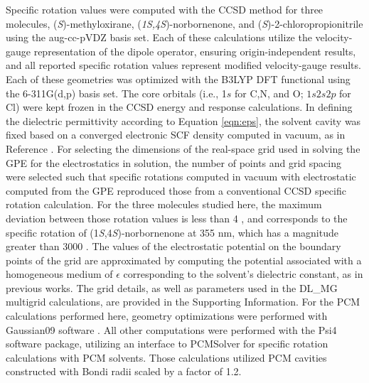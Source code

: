 Specific rotation values were computed with the CCSD method for three
molecules, (\emph{S})-methyloxirane, (\emph{1S,4S})-norbornenone, and
(\emph{S})-2-chloropropionitrile using the aug-cc-pVDZ basis set.
\cite{Kendall:92}
Each of these calculations utilize
the velocity-gauge representation of the dipole operator, ensuring
origin-independent results, and all reported specific rotation values represent
modified velocity-gauge results.\cite{Pedersen:04b}
Each of these geometries was optimized with the B3LYP DFT functional
using the 6-311G(d,p) basis set.\cite{Krishnan:80} The core orbitals
(i.e., 1$s$ for C,N, and O; $1s2s2p$ for Cl) were kept frozen
in the CCSD energy and response calculations.
In defining the dielectric permittivity according to Equation \ref{eqn:eps},
the solvent cavity was fixed based on a converged electronic SCF density
computed in vacuum, as in Reference . For selecting
the dimensions of the real-space grid used in solving the GPE for the
electrostatics in solution, the number of points and grid spacing were
selected such that specific rotations computed in vacuum with electrostatic
computed from the GPE reproduced those from a conventional CCSD specific
rotation calculation. For the three molecules studied here, the maximum
deviation between those rotation values is less than 4 \rotunits, and
corresponds to the specific rotation of (1\emph{S},4\emph{S})-norbornenone
at 355 nm, which has a magnitude greater than 3000 \rotunits. The values of the electrostatic potential on the boundary points of the grid are approximated by computing the potential associated with a homogeneous medium of $\epsilon$ corresponding to the solvent's dielectric constant, as in previous works.\cite{Dziedzic:11,Howard:17} The grid
details, as well as parameters used in the DL\_MG multigrid calculations,
are provided in the Supporting Information. For the PCM calculations performed
here, geometry optimizations were performed with Gaussian09 software
\cite{g09}. All other computations were performed with the Psi4 software
package,\cite{psi4} utilizing an interface to PCMSolver\cite{pcmsolver}
for specific rotation calculations with PCM solvents. Those calculations
utilized PCM cavities constructed with Bondi radii scaled by a factor of 1.2.
